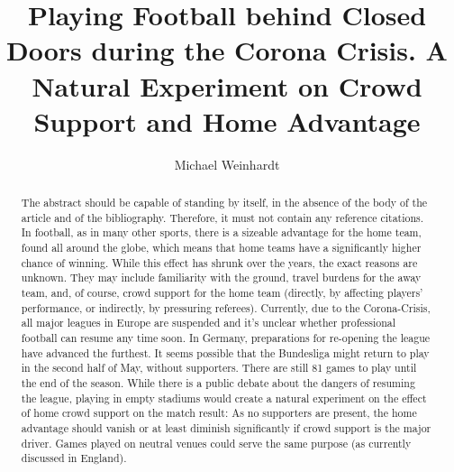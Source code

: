 \documentclass[Afour,sageh,times]{sagej}
\begin{document}

\title{Playing Football behind Closed Doors during the Corona Crisis. A Natural Experiment on Crowd Support and Home Advantage}

\author{Michael Weinhardt}




\begin{abstract}  The abstract should be capable of standing by itself,
in the absence of the body of the article and of the bibliography.
Therefore, it must not contain any reference citations.
In football, as in many other sports, there is a sizeable advantage for the home team, found all around the globe, which means that home teams have a significantly higher chance of winning. While this effect has shrunk over the years, the exact reasons are unknown. They may include familiarity with the ground, travel burdens for the away team, and, of course, crowd support for the home team (directly, by affecting players’ performance, or indirectly, by pressuring referees). Currently, due to the Corona-Crisis, all major leagues in Europe are suspended and it’s unclear whether professional football can resume any time soon. In Germany, preparations for re-opening the league have advanced the furthest. It seems possible that the Bundesliga might return to play in the second half of May, without supporters. There are still 81 games to play until the end of the season. While there is a public debate about the dangers of resuming the league, playing in empty stadiums would create a natural experiment on the effect of home crowd support on the match result: As no supporters are present, the home advantage should vanish or at least diminish significantly if crowd support is the major driver. Games played on neutral venues could serve the same purpose (as currently discussed in England).
\end{abstract}


\maketitle
\end{document}
